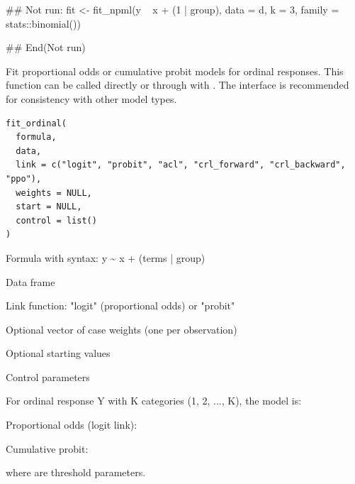 \documentclass[a4paper]{book}
\begin{document}
%
\begin{Examples}
\begin{ExampleCode}
## Not run: 
fit <- fit_npml(y ~ x + (1 | group), data = d, k = 3,
                family = stats::binomial())

## End(Not run)

\end{ExampleCode}
\end{Examples}
%
\begin{Description}
Fit proportional odds or cumulative probit models for ordinal responses.
This function can be called directly or through  with
. The  interface is recommended
for consistency with other model types.
\end{Description}
%
\begin{Usage}
\begin{verbatim}
fit_ordinal(
  formula,
  data,
  link = c("logit", "probit", "acl", "crl_forward", "crl_backward", "ppo"),
  weights = NULL,
  start = NULL,
  control = list()
)
\end{verbatim}
\end{Usage}
%
\begin{Arguments}
\begin{ldescription}
\item[\code{formula}] Formula with syntax: y \textasciitilde{} x + (terms | group)

\item[\code{data}] Data frame

\item[\code{link}] Link function: "logit" (proportional odds) or "probit"

\item[\code{weights}] Optional vector of case weights (one per observation)

\item[\code{start}] Optional starting values

\item[\code{control}] Control parameters
\end{ldescription}
\end{Arguments}
%
\begin{Details}
For ordinal response Y with K categories (1, 2, ..., K), the model is:

Proportional odds (logit link):

Cumulative probit:

where  are threshold parameters.
\end{Details}
\end{document}
